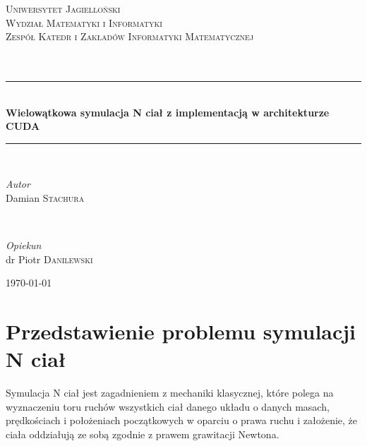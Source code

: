 \documentclass[14pt,twoside,a4paper]{article}
\begin{document}
\begin{titlepage}
	\newcommand{\HRule}{\rule{\linewidth}{0.5mm}}
	
	\center
	
	\textsc{\Large Uniwersytet  Jagielloński\\
			 Wydział Matematyki i Informatyki\\
    		 Zespół Katedr i Zakładów Informatyki Matematycznej}\\[1.5cm]
	
	\textsc{\Large}\\[0.5cm]
	
	\textsc{\Large}\\[0.5cm]
	
	\HRule\\[0.4cm]
		
	{\huge\bfseries Wielowątkowa symulacja N ciał z implementacją w architekturze CUDA}\\[0.4cm] %
	
	\HRule\\[1.5cm]
	
	\begin{minipage}{0.4\textwidth}
		\begin{flushleft}
			\large
			\textit{Autor}\\
			Damian \textsc{Stachura} %
		\end{flushleft}
	\end{minipage}
	~
	\begin{minipage}{0.4\textwidth}
		\begin{flushright}
			\large
			\textit{Opiekun}\\
			dr Piotr \textsc{Danilewski} %
		\end{flushright}
	\end{minipage}
	
	\vfill\vfill %
	
	{\large\today} %
	
\end{titlepage}

\newpage
\tableofcontents

\newpage

\section{\LARGE Przedstawienie problemu symulacji N ciał}
\bigskip
Symulacja N ciał jest zagadnieniem z mechaniki klasycznej, które polega na wyznaczeniu toru ruchów wszystkich ciał danego układu o danych masach, prędkościach i położeniach początkowych w oparciu o prawa ruchu i założenie, że ciała oddziałują ze sobą zgodnie z prawem grawitacji Newtona. \\
\end{document}
